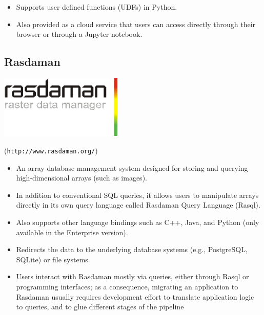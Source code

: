 \documentclass[a0,landscape]{a0poster}
\begin{document}
\begin{multicols}{3}
\begin{itemize}
   \item Supports user defined functions (UDFs) in Python.

   \item Also provided as a cloud service that users can access directly through their browser or through a Jupyter notebook.

\end{itemize}
\begin{minipage}[b]{0.75\linewidth}
  \subsection*{Rasdaman}
\end{minipage}
\begin{minipage}[b]{0.25\linewidth}
  \includegraphics[height=3cm]{rasdaman-logo.png}
\end{minipage}

(\texttt{http://www.rasdaman.org/})
\begin{itemize}
\item An array database management system designed for storing and querying high-dimensional arrays (such as images).

\item In addition to conventional SQL queries, it allows users to manipulate arrays directly in its own query language called Rasdaman Query Language (Rasql).

\item Also supports other language bindings such as C++, Java, and Python (only available in the Enterprise version).

\item Redirects the data to the underlying database systems (e.g., PostgreSQL, SQLite) or file systems.

\item Users interact with Rasdaman mostly via queries, either through Rasql or programming interfaces; as a consequence, migrating an application to Rasdaman usually requires development effort to translate application logic to queries, and to glue different stages of the pipeline
\end{itemize}


\end{multicols}
\end{document}
